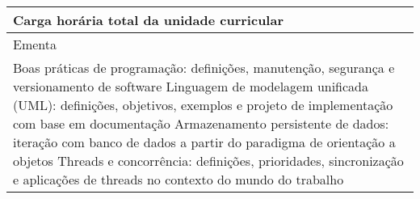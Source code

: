 \begin{quadro}[ht!]
\begin{tabular}{|p{3cm} p{2cm} p{3cm} p{2cm} p{3cm} p{2cm}|}
\multicolumn{5}{|p{13cm}|}{\cellcolor{blue1} Carga horária total da unidade curricular} & \multicolumn{1}{p{1cm}|}{\raggedleft 90	}\\\hline
\multicolumn{6}{|p{15cm}|}{\cellcolor{blue1} Ementa} \\\hline
\hline\multicolumn{6}{|p{15cm}|}{\scriptsize Boas práticas de programação: definições, manutenção, segurança e versionamento de software Linguagem de modelagem unificada (UML): definições, objetivos, exemplos e projeto de implementação com base em documentação Armazenamento persistente de dados: iteração com banco de dados a partir do paradigma de orientação a objetos Threads e concorrência: definições, prioridades, sincronização e aplicações de threads no contexto do mundo do trabalho}\\\hline
\hline
	\end{tabular}
\end{quadro}

